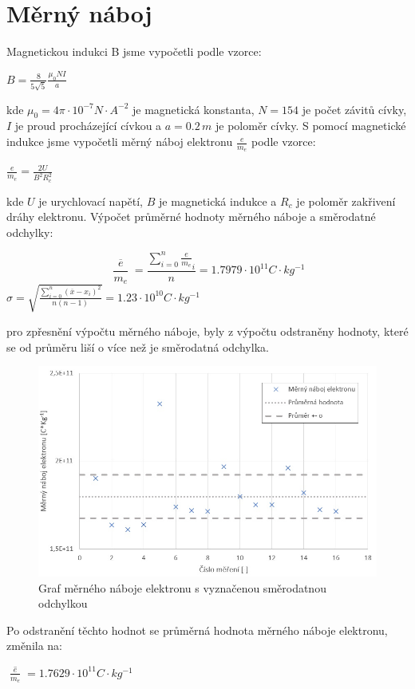 \documentclass[11pt, a4paper]{report}
\begin{document}
\section{Měrný náboj}
Magnetickou indukci B jsme vypočetli podle vzorce:
\begin{center}
	\LARGE
	$B = \frac{8}{5\sqrt{5}}\frac{\mu_0NI}{a}$
\end{center}
kde $\mu_0 = 4\pi\cdot 10^{-7} N\cdot A^{-2}$ je magnetická konstanta, $N = 154$ je počet závitů cívky, $I$ je proud procházející cívkou
a $a = 0.2\, m$ je poloměr cívky.
\newline
\newline
S pomocí magnetické indukce jsme vypočetli měrný náboj elektronu $\frac{e}{m_e}$ podle vzorce:
\begin{center}
	\LARGE
	$ \frac{e}{m_e} = \frac{2U}{B^2 R^2_c}$
\end{center}
kde $U$ je urychlovací napětí, $B$ je magnetická indukce a $R_c$ je poloměr zakřivení dráhy elektronu.
\newline
\newline
Výpočet průměrné hodnoty měrného náboje a směrodatné odchylky:
\begin{center}
	\Large
	\[\overline{\;\frac{e}{m_e}\;} = \frac{\sum_{i=0}^{n}\frac{e}{m_e}_i}{n}= 1.7979\cdot 10^{11} C\cdot kg^{-1}\]
	\newline
	$ \sigma = \sqrt{\frac{\sum_{i=0}^{n}(\overline{x}-x_i)^2}{n(n-1)}} = 1.23\cdot 10^{10} C\cdot kg^{-1}$
\end{center}
pro zpřesnění výpočtu měrného náboje, byly z výpočtu odstraněny hodnoty, které se od průměru liší o více než je směrodatná odchylka.
\newline
\begin{figure}[h] %
    \centering
    \includegraphics[scale = 0.55]{mer_naboj_graf.jpg}
    \caption{Graf měrného náboje elektronu s vyznačenou směrodatnou odchylkou}
    \label{fig:example_image} %
\end{figure}
\clearpage
Po odstranění těchto hodnot se průměrná hodnota měrného náboje elektronu, změnila na:
\begin{center}
	\Large
	$\overline{\;\frac{e}{m_e}\;} = 1.7629\cdot 10^{11} C\cdot kg^{-1}$
\end{center}
\end{document}
